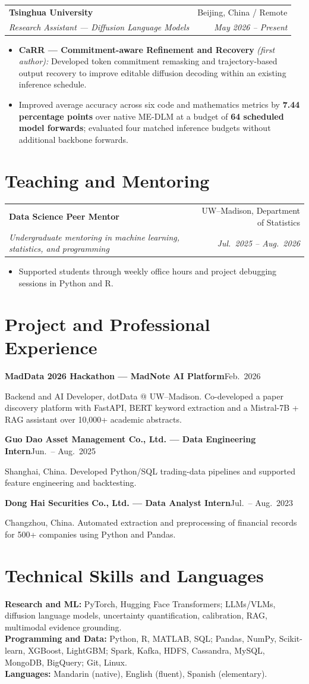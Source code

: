 \documentclass[10pt,a4paper]{article}
\makeatletter
\newcommand{\entry}[4]{%
  \needspace{3\baselineskip}%
  \begin{tabularx}{\linewidth}{@{}Xr@{}}
    \textbf{#1} & #2\\[-1pt]
    \textit{#3} & \textit{#4}
  \end{tabularx}\par
}
\newcommand{\compactentry}[3]{%
  \needspace{3\baselineskip}%
  \textbf{#1}\hfill #2\par
  #3\par\vspace{3pt}
}
\makeatother
\begin{document}
\vspace{6pt}
\entry{Tsinghua University}{Beijing, China / Remote}
{Research Assistant --- Diffusion Language Models}{May 2026 -- Present}
\begin{itemize}[topsep=4pt,itemsep=3pt]
  \item \textbf{CaRR --- Commitment-aware Refinement and Recovery} \textit{(first author):} Developed token commitment remasking and trajectory-based output recovery to improve editable diffusion decoding within an existing inference schedule.
  \item Improved average accuracy across six code and mathematics metrics by \textbf{7.44 percentage points} over native ME-DLM at a budget of \textbf{64 scheduled model forwards}; evaluated four matched inference budgets without additional backbone forwards.
\end{itemize}

\section{Teaching and Mentoring}
\entry{Data Science Peer Mentor}{UW--Madison, Department of Statistics}
{Undergraduate mentoring in machine learning, statistics, and programming}{Jul.\ 2025 -- Aug.\ 2026}
\begin{itemize}
  \item Supported students through weekly office hours and project debugging sessions in Python and R.
\end{itemize}

\section{Project and Professional Experience}
\compactentry{MadData 2026 Hackathon --- MadNote AI Platform}{Feb.\ 2026}
{Backend and AI Developer, dotData @ UW--Madison. Co-developed a paper discovery platform with FastAPI, BERT keyword extraction and a Mistral-7B + RAG assistant over 10,000+ academic abstracts.}

\compactentry{Guo Dao Asset Management Co., Ltd. --- Data Engineering Intern}{Jun.\ -- Aug.\ 2025}
{Shanghai, China. Developed Python/SQL trading-data pipelines and supported feature engineering and backtesting.}

\compactentry{Dong Hai Securities Co., Ltd. --- Data Analyst Intern}{Jul.\ -- Aug.\ 2023}
{Changzhou, China. Automated extraction and preprocessing of financial records for 500+ companies using Python and Pandas.}

\section{Technical Skills and Languages}
\textbf{Research and ML:} PyTorch, Hugging Face Transformers; LLMs/VLMs, diffusion language models, uncertainty quantification, calibration, RAG, multimodal evidence grounding.\\[3pt]
\textbf{Programming and Data:} Python, R, MATLAB, SQL; Pandas, NumPy, Scikit-learn, XGBoost, LightGBM; Spark, Kafka, HDFS, Cassandra, MySQL, MongoDB, BigQuery; Git, Linux.\\[3pt]
\textbf{Languages:} Mandarin (native), English (fluent), Spanish (elementary).
\end{document}
